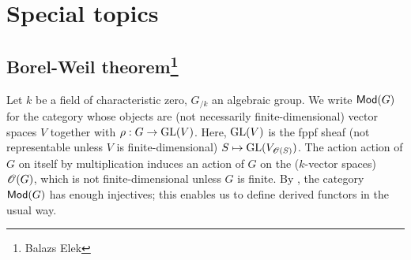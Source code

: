 
\section{Special topics}





\subsection[Borel-Weil theorem]{Borel-Weil theorem\footnote{Balazs Elek}}

Let $k$ be a field of characteristic zero, $G_{/k}$ an algebraic group. We 
write $\mathsf{Mod}(G)$ for the category whose objects are (not necessarily 
finite-dimensional) vector spaces $V$ together with $\rho:G\to \operatorname{GL}(V)$. Here, 
$\operatorname{GL}(V)$ is the fppf sheaf (not representable unless $V$ is finite-dimensional) 
$S\mapsto \operatorname{GL}(V_{\mathscr{O}(S)})$. The action action of $G$ on itself by 
multiplication induces an action of $G$ on the ($k$-vector spaces) $\mathscr{O}(G)$, 
which is not finite-dimensional unless $G$ is finite. By 
\cite[I 3.9]{jantzen-2003}, the category $\mathsf{Mod}(G)$ has enough injectives; 
this enables us to define derived functors in the usual way. 


